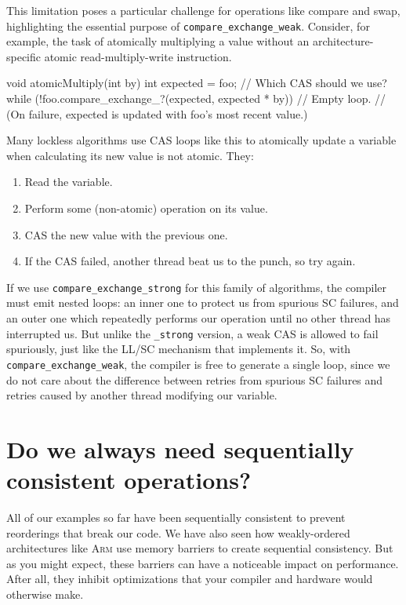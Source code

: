 \documentclass[fontsize=10pt, oneside]{scrartcl}
\newcommand{\monobox}[1]{\mbox{\texttt{#1}}}
\begin{document}
This limitation poses a particular challenge for operations like compare and swap,
highlighting the essential purpose of \monobox{compare\_exchange\_weak}.
Consider, for example, the task of atomically multiplying a value without an architecture-specific atomic read-multiply-write instruction.
\begin{cppcode}
void atomicMultiply(int by)
{
    int expected = foo;
    // Which CAS should we use?
    while (!foo.compare_exchange_?(expected, expected * by)) {
        // Empty loop.
        // (On failure, expected is updated with foo's most recent value.)
    }
}
\end{cppcode}
Many lockless algorithms use \textsc{CAS} loops like this to atomically update a variable when calculating its new value is not atomic.
They:
\begin{enumerate}
  \item Read the variable.
  \item Perform some (non-atomic) operation on its value.
  \item \textsc{CAS} the new value with the previous one.
  \item If the \textsc{CAS} failed, another thread beat us to the punch, so try again.
\end{enumerate}
If we use \monobox{compare\_exchange\_strong} for this family of algorithms,
the compiler must emit nested loops:
an inner one to protect us from spurious \textsc{SC} failures,
and an outer one which repeatedly performs our operation until no other thread has interrupted us.
But unlike the \monobox{\_strong} version,
a weak \textsc{CAS} is allowed to fail spuriously, just like the \textsc{LL/SC} mechanism that implements it.
So, with \monobox{compare\_exchange\_weak},
the compiler is free to generate a single loop,
since we do not care about the difference between retries from spurious \textsc{SC} failures and retries caused by another thread modifying our variable.

\section{Do we always need sequentially consistent operations?}
\label{lock-example}

All of our examples so far have been sequentially consistent to prevent reorderings that break our code.
We have also seen how weakly-ordered architectures like \textsc{Arm} use memory barriers to create sequential consistency.
But as you might expect,
these barriers can have a noticeable impact on performance.
After all,
they inhibit optimizations that your compiler and hardware would otherwise make.
\end{document}
